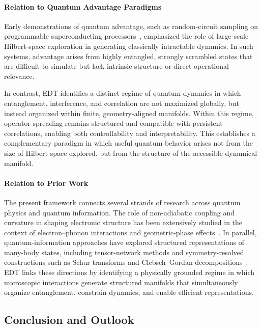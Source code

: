 \paragraph*{Relation to Quantum Advantage Paradigms}

Early demonstrations of quantum advantage, such as random-circuit sampling on programmable superconducting processors~\cite{Arute2019}, emphasized the role of large-scale Hilbert-space exploration in generating classically intractable dynamics. In such systems, advantage arises from highly entangled, strongly scrambled states that are difficult to simulate but lack intrinsic structure or direct operational relevance.

In contrast, EDT identifies a distinct regime of quantum dynamics in which entanglement, interference, and correlation are not maximized globally, but instead organized within finite, geometry-aligned manifolds. Within this regime, operator spreading remains structured and compatible with persistent correlations, enabling both controllability and interpretability. This establishes a complementary paradigm in which useful quantum behavior arises not from the size of Hilbert space explored, but from the structure of the accessible dynamical manifold.

\paragraph*{Relation to Prior Work}

The present framework connects several strands of research across quantum physics and quantum information. The role of non-adiabatic coupling and curvature in shaping electronic structure has been extensively studied in the context of electron--phonon interactions and geometric-phase effects~\cite{Mead1979,Yarkony1996,Giustino2017}. In parallel, quantum-information approaches have explored structured representations of many-body states, including tensor-network methods and symmetry-resolved constructions such as Schur transforms and Clebsch--Gordan decompositions~\cite{Schollwock2011,Bacon2006}. EDT links these directions by identifying a physically grounded regime in which microscopic interactions generate structured manifolds that simultaneously organize entanglement, constrain dynamics, and enable efficient representations.

\subsection{Conclusion and Outlook}

